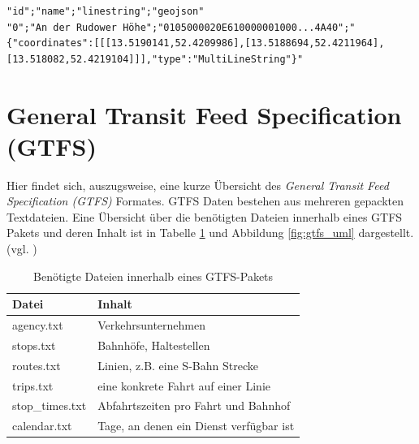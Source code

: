 \lstset{
  language=,
  numbers=left,
  caption=Beispielausgabe des OsmosisStreetExtractor,
  label=,
  keywordstyle=,
  stringstyle=,
  commentstyle=,
  morecomment=,
}
\begin{lstlisting}
"id";"name";"linestring";"geojson"
"0";"An der Rudower Höhe";"0105000020E610000001000...4A40";"{"coordinates":[[[13.5190141,52.4209986],[13.5188694,52.4211964],[13.518082,52.4219104]]],"type":"MultiLineString"}"
\end{lstlisting}

\section{General Transit Feed Specification (GTFS)}
\label{sec:appendix:gtfs_spec}
Hier findet sich, auszugsweise, eine kurze Übersicht des \textit{General Transit Feed Specification (GTFS)} Formates.
GTFS Daten bestehen aus mehreren gepackten Textdateien.
Eine Übersicht über die benötigten Dateien innerhalb eines GTFS Pakets und deren Inhalt ist in Tabelle \ref{tab:gtfs_files} und Abbildung \ref{fig:gtfs_uml} dargestellt. (vgl. \cite{WEB:Google:gtfs:2016})


\begin{table}[h]
\centering
\caption{Benötigte Dateien innerhalb eines GTFS-Pakets}
\label{tab:gtfs_files}
\begin{tabular}{|l|l|}
\hline
\textbf{Datei}  & \textbf{Inhalt}                         \\ \hline
agency.txt      & Verkehrsunternehmen                     \\ \hline
stops.txt       & Bahnhöfe, Haltestellen                  \\ \hline
routes.txt      & Linien, z.B. eine S-Bahn Strecke        \\ \hline
trips.txt       & eine konkrete Fahrt auf einer Linie     \\ \hline
stop\_times.txt & Abfahrtszeiten pro Fahrt und Bahnhof    \\ \hline
calendar.txt    & Tage, an denen ein Dienst verfügbar ist \\ \hline
\end{tabular}
\end{table}

